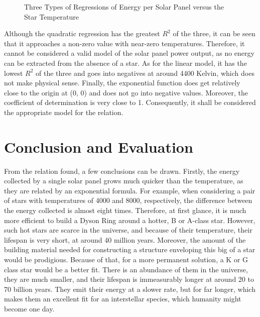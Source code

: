 \documentclass[stu, 11pt, a4paper, floatsintext, noextraspace]{apa7}
\begin{document}
	\begin{figure}[h!]
		\centering
		\caption{Three Types of Regressions of Energy per Solar Panel versus the Star Temperature}
		\label{fig6:best_fit_lines}
	\end{figure}
	Although the quadratic regression has the greatest $R^2$ of the three, it can be seen that it approaches a non-zero value with near-zero temperatures. Therefore, it cannot be considered a valid model of the solar panel power output, as no energy can be extracted from the absence of a star. As for the linear model, it has the lowest $R^2$ of the three and goes into negatives at around 4400 Kelvin, which does not make physical sense. Finally, the exponential function does get relatively close to the origin at (0, 0) and does not go into negative values. Moreover, the coefficient of determination is very close to 1. Consequently, it shall be considered the appropriate model for the relation.
	\section{Conclusion and Evaluation}
	From the relation found, a few conclusions can be drawn. Firstly, the energy collected by a single solar panel grows much quicker than the temperature, as they are related by an exponential formula. For example, when considering a pair of stars with temperatures of 4000 and 8000, respectively, the difference between the energy collected is almost eight times. Therefore, at first glance, it is much more efficient to build a Dyson Ring around a hotter, B or A-class star. However, such hot stars are scarce in the universe, and because of their temperature, their lifespan is very short, at around 40 million years. Moreover, the amount of the building material needed for constructing a structure enveloping this big of a star would be prodigious. Because of that, for a more permanent solution, a K or G class star would be a better fit. There is an abundance of them in the universe, they are much smaller, and their lifespan is immeasurably longer at around 20 to 70 billion years. They emit their energy at a slower rate, but for far longer, which makes them an excellent fit for an interstellar species, which humanity might become one day.
	
\end{document}
